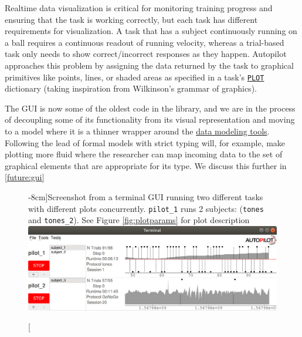 Realtime data visualization is critical for monitoring training progress and ensuring that the task is working correctly, but each task has different requirements for visualization. A task that has a subject continuously running on a ball requires a continuous readout of running velocity, whereas a trial-based task only needs to show correct/incorrect responses as they happen. Autopilot approaches this problem by assigning the data returned by the task to graphical primitives like points, lines, or shaded areas as specified in a task's \hyperref[sec:taskcomponents]{\texttt{PLOT}} dictionary (taking inspiration from Wilkinson's grammar of graphics\citep{wilkinsonGrammarGraphics2012}).

The GUI is now some of the oldest code in the library, and we are in the process of decoupling some of its functionality from its visual representation and moving to a model where it is a thinner wrapper around the \hyperref[sec:data]{data modeling tools}. Following the lead of formal models with strict typing will, for example, make plotting more fluid where the researcher can map incoming data to the set of graphical elements that are appropriate for its type. We discuss this further in \ref{future:gui}

\begin{figure}[hb!]
\caption[][-8cm]{Screenshot from a terminal GUI running two different tasks with different plots concurrently. \texttt{pilot\_1} runs 2 subjects: (\texttt{tones} and \texttt{tones\_2}). See Figure \ref{fig:plotparams} for plot description}
\label{fig:gui}
\includegraphics[]{figures/ss_3_nocrop.png}
\end{figure}%
